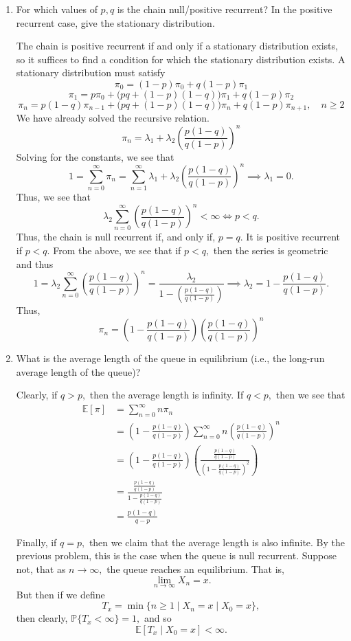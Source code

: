 \documentclass[11pt]{article}
\newcommand{\bbE}{\mathbb{E}}
\newcommand{\bbP}{\mathbb{P}}
\begin{document}
\begin{enumerate}[label=(\alph*)]
    \item For which values of \(p,q\) is the chain null/positive recurrent? In the positive recurrent case, give the stationary distribution.
\begin{solution}
    The chain is positive recurrent if and only if a stationary distribution exists, so it suffices to find a condition for which the stationary distribution exists. A stationary distribution must satisfy 
    \[\pi_0 = (1-p)\pi_0 + q(1-p)\pi_1\]
    \[\pi_1 = p \pi_0 + \big(pq +(1-p)(1-q)\big) \pi_1 + q(1-p)\pi_2\]
    \[\pi_n = p(1-q) \pi_{n-1} + \big(pq + (1-p)(1-q)\big)\pi_n + q(1-p)\pi_{n+1}, \quad n\geq 2\]
    We have already solved the recursive relation. 
    \[\pi_n = \lambda_1 + \lambda_2\left(\frac{p(1-q)}{q(1-p)}\right)^n\]
    Solving for the constants, we see that 
    \[1 = \sum_{n=0}^\infty \pi_n = \sum_{n=1}^\infty \lambda_1 + \lambda_2\left(\frac{p(1-q)}{q(1-p)}\right)^n \implies \lambda_1 = 0.\] Thus, we see that 
    \[\lambda_2\sum_{n=0}^\infty \left(\frac{p(1-q)}{q(1-p)}\right)^n < \infty \iff p < q.\] Thus, the chain is null recurrent if, and only if, $p = q.$ It is positive recurrent if $p<q.$ From the above, we see that if $p<q,$ then the series is geometric and thus 
    \[1 = \lambda_2\sum_{n=0}^\infty \left(\frac{p(1-q)}{q(1-p)}\right)^n = \frac{\lambda_2}{1 - (\frac{p(1-q)}{q(1-p)})} \implies \lambda_2 = 1 - \frac{p(1-q)}{q(1-p)}.\] Thus, 
    \[\boxed{\pi_n = (1 - \frac{p(1-q)}{q(1-p)})\left(\frac{p(1-q)}{q(1-p)}\right)^n}\]
\end{solution}
    
    \item What is the average length of the queue in equilibrium (i.e., the long-run average length of the queue)?
    \begin{solution}
        Clearly, if $q> p,$ then the average length is infinity. If $q<p,$ then we see that 
\begin{align*}
\bbE[\pi] &= \sum_{n=0}^\infty n\pi_n\\ &= (1 - \frac{p(1-q)}{q(1-p)})\sum_{n=0}^\infty n\left(\frac{p(1-q)}{q(1-p)}\right)^n\\ &= (1 - \frac{p(1-q)}{q(1-p)})\left(\frac{\frac{p(1-q)}{q(1-p)}}{(1 - \frac{p(1-q)}{q(1-p)})^2}\right)\\ &= \frac{\frac{p(1-q)}{q(1-p)}}{1 - \frac{p(1-q)}{q(1-p)}}\\ &= \boxed{\frac{p(1-q)}{q-p}}    
\end{align*}

Finally, if $q = p,$ then we claim that the average length is also infinite. By the previous problem, this is the case when the queue is null recurrent. Suppose not, that as $n\to \infty,$ the queue reaches an equilibrium. That is, 
\[\lim_{n\to \infty} X_n = x.\] But then if we define 
\[T_x = \min\{n \geq 1 \mid X_n = x \mid X_0 = x\},\] then clearly, $\bbP\{T_x < \infty\} = 1,$ and so 
\[\bbE[T_x \mid X_0 = x] < \infty.\]

    \end{solution}
\end{enumerate}
\end{document}

